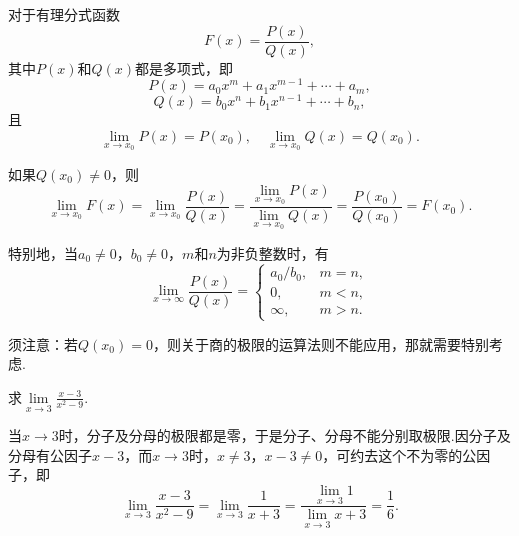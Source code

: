 \begin{example}
对于有理分式函数\[
F(x) = \frac{P(x)}{Q(x)},
\]其中\(P(x)\)和\(Q(x)\)都是多项式，即\[
P(x) = a_0 x^m + a_1 x^{m-1} + \dotsb + a_m,
\]\[
Q(x) = b_0 x^n + b_1 x^{n-1} + \dotsb + b_n,
\]且\[
\lim\limits_{x \to x_0} P(x) = P(x_0),
\quad
\lim\limits_{x \to x_0} Q(x) = Q(x_0).
\]

如果\(Q(x_0) \neq 0\)，则\[
\lim\limits_{x \to x_0} F(x)
= \lim\limits_{x \to x_0} \frac{P(x)}{Q(x)}
= \frac{\lim\limits_{x \to x_0} P(x)}{\lim\limits_{x \to x_0} Q(x)}
= \frac{P(x_0)}{Q(x_0)}
= F(x_0).
\]

特别地，当\(a_0\neq0\)，\(b_0\neq0\)，\(m\)和\(n\)为非负整数时，有
\[
\lim\limits_{x\to\infty}\frac{P(x)}{Q(x)} = \left\{ \begin{array}{cl}
a_0/b_0, & m=n, \\
0, & m<n, \\
\infty, & m>n.
\end{array} \right.
\]
\end{example}
须注意：若\(Q(x_0) = 0\)，则关于商的极限的运算法则不能应用，那就需要特别考虑.

\begin{example}
求\(\lim\limits_{x \to 3}\frac{x-3}{x^2-9}\).
\begin{solution}
当\(x \to 3\)时，分子及分母的极限都是零，于是分子、分母不能分别取极限.因分子及分母有公因子\(x - 3\)，而\(x \to 3\)时，\(x \neq 3\)，\(x - 3 \neq 0\)，可约去这个不为零的公因子，即\[
\lim\limits_{x \to 3}\frac{x - 3}{x^2 - 9}
= \lim\limits_{x \to 3}\frac{1}{x + 3}
= \frac{\lim\limits_{x \to 3} 1}{\lim\limits_{x \to 3} x+3}
= \frac{1}{6}.
\]
\end{solution}
\end{example}

